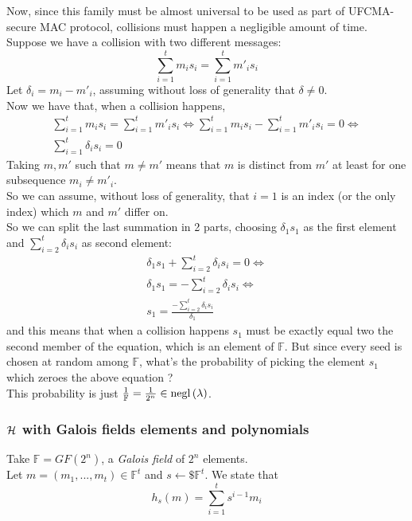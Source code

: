 Now, since this family must be almost universal to be used as part of
 UFCMA-secure MAC protocol, collisions must happen a negligible amount of
 time.\\
 Suppose we have a collision with two different messages:
\[
     \sum_{i=1}^{t} m_{i}s_{i}=\sum_{i=1}^{t} m'_{i}s_{i}
\]
 Let $\delta_{i}=m_{i}-m'_{i}$, assuming  without loss of generality that
 $\delta \not= 0$.\\
 Now we have that, when a collision happens, 
 \begin{gather*}
     \sum_{i=1}^{t} m_{i}s_{i}=\sum_{i=1}^{t} m'_{i}s_{i}\Leftrightarrow 
     \sum_{i=1}^{t} m_{i}s_{i}-\sum_{i=1}^{t} m'_{i}s_{i}=0 \Leftrightarrow \\
     \sum_{i=1}^{t} \delta_{i}s_{i}=0 
 \end{gather*}
 Taking $m, m'$ such that $m \not= m'$ means that $m$ is distinct from $m'$
 at least for one subsequence $m_{i}\not=m'_{i}$.\\
 So we can assume, without loss of generality, that $i=1$ is an index (or the
 only index) which $m$ and $m'$ differ on.\\

 So we can split the last summation in 2 parts, choosing $\delta_{1}s_{1}$ as
 the first element and $ \sum_{i=2}^{t} \delta_{i}s_{i}$ as second element:\\
 \begin{gather*}
         \delta_{1}s_{1}+\sum_{i=2}^{t} \delta_{i}s_{i}=0 \Leftrightarrow \\
         \delta_{1}s_{1}=-\sum_{i=2}^{t} \delta_{i}s_{i} \Leftrightarrow \\
         s_{1}=\frac{-\sum_{i=2}^{t} \delta_{i}s_{i}}{\delta_{1}}
     \end{gather*}
     and this means that when a collision happens $s_{1}$ must be exactly equal 
     two the second member of the equation, which is an element of $\mathbb{F}$.
     But since every seed is chosen at random among $ \mathbb{F} $, what's the
     probability of picking the element $s_{1}$ which zeroes the above equation
     ?\\
     This probability is just $\frac{1}{ \mathbb{F} } = \frac{1}{2^{n}} \in
     \mathrm{negl}\left({\lambda}\right) $.
     \subsubsection{$\mathcal{H}$ with Galois fields elements and polynomials}

 \begin{construction}
     Take $ \mathbb{F}=GF(2^{n})$, a \textit{Galois field} of $2^{n}$
     elements.\\
     Let $m=(m_{1}, ..., m_{t}) \in \mathbb{F}^{t} $ and $s \leftarrow\$ 
     \mathbb{F}^{t} $. We state that 
     \[
         h_{s}(m)= \sum_{i=1}^{t}s^{i-1}m_{i}
        \]
 \end{construction}


